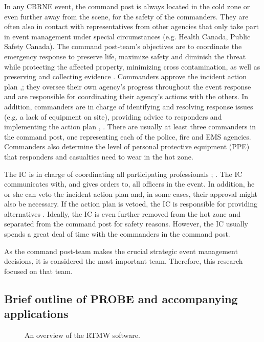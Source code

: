 \documentclass[link]{IWCOMP}
\begin{document}
In any CBRNE event, the command post is always located in the cold zone or
even further away from the scene, for the safety of the commanders. They are
often also in contact with representatives from other agencies that only
take part in event management under special circumstances (e.g. Health
Canada, Public Safety Canada). The command post-team's objectives are to
coordinate the emergency response to preserve life, maximize safety and
diminish the threat while protecting the affected property, minimizing cross
contamination, as well as preserving and collecting evidence \citep{bib24}.
Commanders approve the incident action plan \citet{bib7},\citet{bib8}; they
oversee their own agency's progress throughout the event response and are
responsible for coordinating their agency's actions with the others. In
addition, commanders are in charge of identifying and resolving response
issues (e.g. a lack of equipment on site), providing advice to responders
and implementing the action plan \citet{bib7}, \citet{bib8}. There are usually
at least three commanders in the command post, one representing each of the
police, fire and EMS agencies. Commanders also determine the level of
personal protective equipment (PPE) that responders and casualties need to
wear in the hot zone.

The IC is in charge of coordinating all participating professionals
\citep{bib26}; \citep{bib35}. The IC communicates with, and
gives orders to, all officers in the event. In addition, he or she can veto
the incident action plan and, in some cases, their approval might also be
necessary. If the action plan is vetoed, the IC is responsible for providing
alternatives \citep{bib14}. Ideally, the IC is even further
removed from the hot zone and separated from the command post for safety
reasons. However, the IC usually spends a great deal of time with the
commanders in the command post.

As the command post-team makes the crucial strategic event management
decisions, it is considered the most important team. Therefore, this
research focused on that team.

\subsection{Brief outline of PROBE and accompanying applications}\label{subsec1.3}

\begin{figure}[!b]
\centerline{}
\caption{An overview of the RTMW software.\label{fig2}}
\end{figure}
\end{document}
